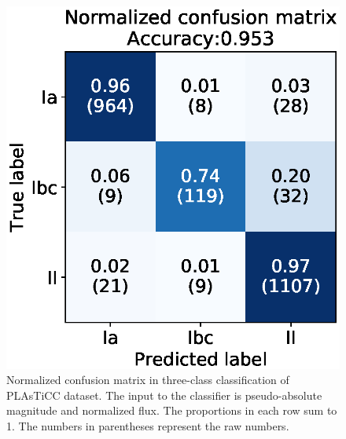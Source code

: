 \documentclass[useamsfonts]{pasj01}
\begin{document}
%
\begin{figure}[htbp]
  \begin{center}
     \includegraphics[width=\columnwidth]{figures/06_CM_abs-mag_scaled-flux_w-mixup_predictions_test_2.eps}
  \end{center}
  \caption{%
  Normalized confusion matrix in three-class classification of PLAsTiCC dataset. The input to the classifier is pseudo-absolute magnitude and normalized flux. The proportions in each row sum to 1. The numbers in parentheses represent the raw numbers.
  }%
  \label{fig:plasticc_3class_CM}
\end{figure}
%
\end{document}
